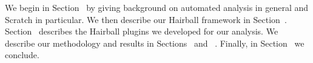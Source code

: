 We begin in Section~ by giving background on automated
analysis in general and Scratch in particular.  We then describe our Hairball
framework in Section~.  Section~
describes the Hairball plugins we developed for our analysis.  We describe our
methodology and results in Sections~ and
~.  Finally, in Section~ we
conclude.
